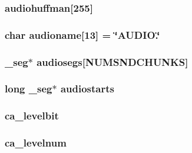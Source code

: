 \hypertarget{ID__CA_8C_a8e5f1f3c10267328291b7098e3647966}{
\subsubsection[{audiohuffman}]{ {\bf audiohuffman}\mbox{[}255\mbox{]}}}
\label{ID__CA_8C_a8e5f1f3c10267328291b7098e3647966}
\hypertarget{ID__CA_8C_aedfaf0a69707063299a02a1af291edc1}{
\subsubsection[{audioname}]{\setlength{\rightskip}{0pt plus 5cm}char {\bf audioname}\mbox{[}13\mbox{]} = \char`\"{}AUDIO.\char`\"{}}}
\label{ID__CA_8C_aedfaf0a69707063299a02a1af291edc1}
\hypertarget{ID__CA_8C_a6a31b9ada480b861c1ed6f0276bda609}{
\subsubsection[{audiosegs}]{ \_\-seg$\ast$ {\bf audiosegs}\mbox{[}NUMSNDCHUNKS\mbox{]}}}
\label{ID__CA_8C_a6a31b9ada480b861c1ed6f0276bda609}
\hypertarget{ID__CA_8C_aca24eee9c13114cc6f73c094c7eb9379}{
\subsubsection[{audiostarts}]{\setlength{\rightskip}{0pt plus 5cm}long \_\-seg$\ast$ {\bf audiostarts}}}
\label{ID__CA_8C_aca24eee9c13114cc6f73c094c7eb9379}
\hypertarget{ID__CA_8C_af4f718356e28be31a81ef4df1a2f7c96}{
\subsubsection[{ca\_\-levelbit}]{ {\bf ca\_\-levelbit}}}
\label{ID__CA_8C_af4f718356e28be31a81ef4df1a2f7c96}
\hypertarget{ID__CA_8C_a2010805bcd6b7bda525f99d095cbf380}{
\subsubsection[{ca\_\-levelnum}]{ {\bf ca\_\-levelnum}}}

